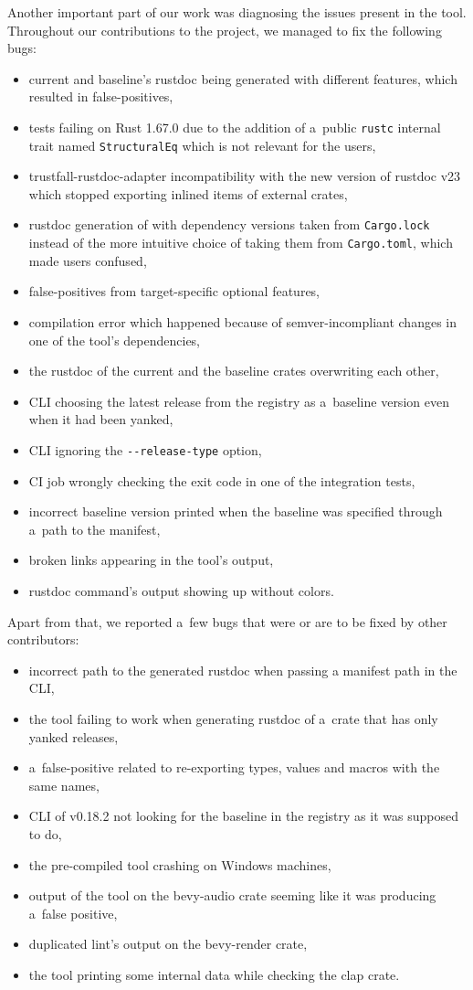 \documentclass[licencjacka,en]{pracamgr}
\begin{document}
Another important part of our work was diagnosing the issues present in the tool.
Throughout our contributions to the project, we managed to fix the following bugs:
\begin{itemize}
	\item current and baseline's rustdoc being generated with different features, which
		resulted in false-positives,
	\item tests failing on Rust 1.67.0 due to the addition of a~public \texttt{rustc}
		internal trait named \texttt{StructuralEq} which is not relevant for the users,
	\item trustfall-rustdoc-adapter incompatibility with the new version of rustdoc v23
		which stopped exporting inlined items of external crates,
	\item rustdoc generation of  with dependency versions taken from
		\texttt{Cargo.lock} instead of the more intuitive choice of taking them
		from \texttt{Cargo.toml}, which made users confused,
	\item false-positives from target-specific optional features,
	\item compilation error which happened because of semver-incompliant changes
		in one of the tool's dependencies,
	\item the rustdoc of the current and the baseline crates overwriting each other,
	\item CLI choosing the latest release from the registry as a~baseline version
		even when it had been yanked,
	\item CLI ignoring the \texttt{-{}-release-type} option,
	\item CI job wrongly checking the exit code in one of
		the integration tests,
	\item incorrect baseline version printed when the baseline was specified through
		a~path to the manifest,
	\item broken links appearing in the tool's output,
	\item rustdoc command's output showing up without colors.
\end{itemize}
Apart from that, we reported a~few bugs that were or are to be fixed by other contributors:
\begin{itemize}
	\item incorrect path to the generated rustdoc when passing a
		manifest path in the CLI,
	\item the tool failing to work when generating rustdoc of a~crate
		that has only yanked releases,
	\item a~false-positive related to re-exporting types, values and
		macros with the same names,
	\item CLI of v0.18.2 not looking for the baseline in the registry
		as it was supposed to do,
	\item the pre-compiled tool crashing on Windows machines,
	\item output of the tool on the bevy-audio crate seeming
		like it was producing a~false positive,
	\item duplicated lint's output on the bevy-render crate,
	\item the tool printing some internal data while checking the clap
		crate.
\end{itemize}
\end{document}
